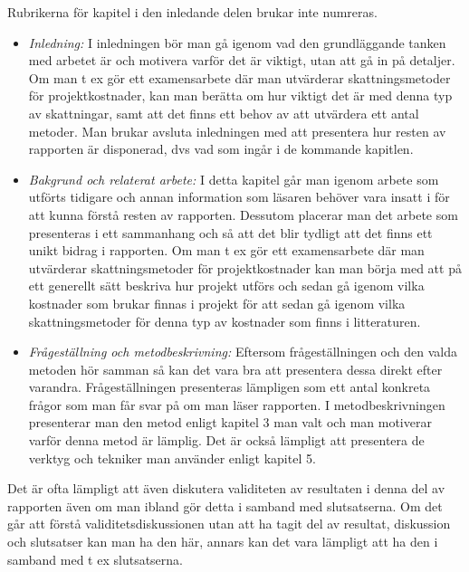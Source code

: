 Rubrikerna för kapitel i den inledande delen brukar inte numreras.

\begin{itemize}
\item
  \emph{Inledning:} I inledningen bör man gå igenom vad den
  grundläggande tanken med arbetet är och motivera varför det är
  viktigt, utan att gå in på detaljer. Om man t ex gör ett examensarbete
  där man utvärderar skattningsmetoder för projektkostnader, kan man
  berätta om hur viktigt det är med denna typ av skattningar, samt att
  det finns ett behov av att utvärdera ett antal metoder. Man brukar
  avsluta inledningen med att presentera hur resten av rapporten är
  disponerad, dvs vad som ingår i de kommande kapitlen.
\item
  \emph{Bakgrund och relaterat arbete:} I detta kapitel går man igenom
  arbete som utförts tidigare och annan information som läsaren behöver
  vara insatt i för att kunna förstå resten av rapporten. Dessutom
  placerar man det arbete som presenteras i ett sammanhang och så att
  det blir tydligt att det finns ett unikt bidrag i rapporten. Om man t
  ex gör ett examensarbete där man utvärderar skattningsmetoder för
  projektkostnader kan man börja med att på ett generellt sätt beskriva
  hur projekt utförs och sedan gå igenom vilka kostnader som brukar
  finnas i projekt för att sedan gå igenom vilka skattningsmetoder för
  denna typ av kostnader som finns i litteraturen.
\item
  \emph{Frågeställning och metodbeskrivning:} Eftersom frågeställningen
  och den valda metoden hör samman så kan det vara bra att presentera
  dessa direkt efter varandra. Frågeställningen presenteras lämpligen
  som ett antal konkreta frågor som man får svar på om man läser
  rapporten. I metodbeskrivningen presenterar man den metod enligt
  kapitel 3 man valt och man motiverar varför denna metod är lämplig.
  Det är också lämpligt att presentera de verktyg och tekniker man
  använder enligt kapitel 5.
\end{itemize}

Det är ofta lämpligt att även diskutera validiteten av resultaten i
denna del av rapporten även om man ibland gör detta i samband med
slutsatserna. Om det går att förstå validitetsdiskussionen utan att ha
tagit del av resultat, diskussion och slutsatser kan man ha den här,
annars kan det vara lämpligt att ha den i samband med t ex slutsatserna.

